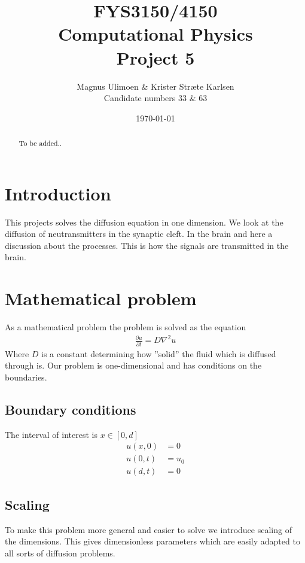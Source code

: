 \documentclass[11pt,a4paper,draft]{article}
\title{FYS3150/4150\\Computational Physics\\Project 5}
\author{Magnus Ulimoen \& Krister Stræte Karlsen\\
Candidate numbers 33 \& 63}
\date{\today}
\numberwithin{equation}{section}
\begin{document}
\maketitle

\begin{abstract}
To be added..
\end{abstract}

\section{Introduction}
This projects solves the diffusion equation in one dimension. We look 
at the diffusion of neutransmitters in the synaptic cleft. In the brain 
and here a discussion about the processes. This is how the signals are
transmitted in the brain.


\section{Mathematical problem}
As a mathematical problem the problem is solved as the equation
\begin{gather}
\frac{\partial u}{\partial t} = D\nabla^2u
\end{gather}
Where $D$ is a constant determining how ''solid'' the fluid which is 
diffused through is. Our problem is one-dimensional and has conditions on 
the boundaries.
\subsection{Boundary conditions}
The interval of interest is $x \in [0, d]$
\begin{align}
u(x,0) &= 0\\
u(0,t) &= u_0\\
u(d,t) &= 0
\end{align}

\subsection{Scaling}
To make this problem more general and easier to solve we introduce 
scaling of the dimensions. This gives dimensionless parameters which 
are easily adapted to all sorts of diffusion problems.
\end{document}

